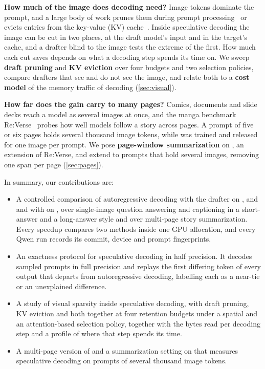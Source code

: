 \noindent\textbf{How much of the image does decoding need?}
Image tokens dominate the prompt, and a large body of work prunes them during prompt processing~\cite{chen2024fastv,yang2025visionzip,xing2025pyramiddrop} or evicts entries from the key-value (KV) cache~\cite{zhang2023h2o,li2024snapkv}.
Inside speculative decoding the image can be cut in two places, at the draft model's input and in the target's cache, and a drafter blind to the image tests the extreme of the first.
How much each cut saves depends on what a decoding step spends its time on.
We sweep \textbf{draft pruning} and \textbf{KV eviction} over four budgets and two selection policies, compare drafters that see and do not see the image, and relate both to a \textbf{cost model} of the memory traffic of decoding (\cref{sec:visual}).

\noindent{}\textbf{How far does the gain carry to many pages?} 
Comics, documents and slide decks reach a model as several images at once, and the manga benchmark Re:Verse~\cite{baranwal2025reverse} probes how well models follow a story across pages.
A prompt of five or six pages holds several thousand image tokens, while \hivis was trained and released for one image per prompt.
We pose \textbf{page-window summarization} on \rvp, an extension of Re:Verse, and extend \hivis to prompts that hold several images, removing one span per page (\cref{sec:pages}).

\noindent In summary, our contributions are:
\begin{itemize}[leftmargin=*,itemsep=1pt,topsep=2pt]
\item A controlled comparison of autoregressive decoding with the drafter \vispec on \llava, \qwenS and \qwenL and with \hivis on \qwenL, over single-image question answering and captioning in a short-answer and a long-answer style and over multi-page story summarization. Every speedup compares two methods inside one GPU allocation, and every Qwen run records its commit, device and prompt fingerprints.
\item An exactness protocol for speculative decoding in half precision. It decodes sampled prompts in full precision and replays the first differing token of every output that departs from autoregressive decoding, labelling each as a near-tie or an unexplained difference.
\item A study of visual sparsity inside speculative decoding, with draft pruning, KV eviction and both together at four retention budgets under a spatial and an attention-based selection policy, together with the bytes read per decoding step and a profile of where that step spends its time.
\item A multi-page version of \hivis and a summarization setting on \rvp that measures speculative decoding on prompts of several thousand image tokens.
\end{itemize}
